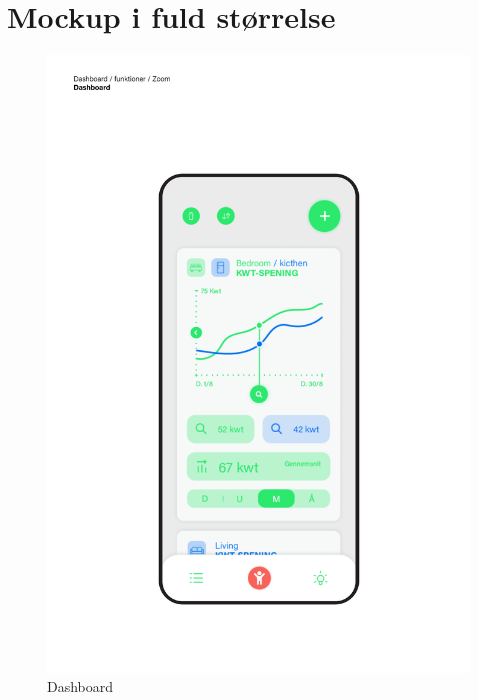 \chapter{Mockup i fuld størrelse}
\label{appendix:mockup}

\begin{figure}
    \centering
    \includegraphics[width=\textwidth]{Images/appendixC/Dashboard.png}
    \caption{Dashboard}
    \label{img:mockup:dashboard}
\end{figure}

